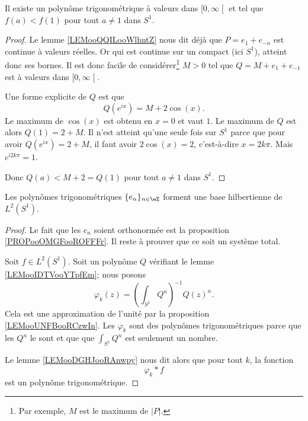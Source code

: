 \begin{lemma}       \label{LEMooIDTVooYTpfEm}
	Il existe un polynôme trigonométrique à valeurs dans \( \mathopen[ 0 , \infty \mathclose[\) et tel que \( f(a)<f(1)\) pour tout \( a\neq 1\) dans \( S^1\).
\end{lemma}

\begin{proof}
	Le lemme \ref{LEMooQQILooWlhntZ} nous dit déjà que \( P=e_1+e_{-n}\) est continue à valeurs réelles. Or qui est continue sur un compact (ici \( S^1\)), atteint donc ses bornes. Il est donc facile de considérer\footnote{Par exemple, \( M\) est le maximum de \( | P |\).} \( M>0\) tel que \( Q=M+e_1+e_{-1}\) est à valeurs dans \( \mathopen[ 0 , \infty \mathclose[\).

	Une forme explicite de \( Q\) est que
	\begin{equation}
		Q( e^{ix})=M+2\cos(x).
	\end{equation}
	Le maximum de \( \cos(x)\) est obtenu en \( x=0\) et vaut \( 1\). Le maximum de \( Q\) est alors \( Q(1)=2+M\). Il n'est atteint qu'une seule fois sur \( S^1\) parce que pour avoir \( Q( e^{ix})=2+M\), il faut avoir \( 2\cos(x)=2\), c'est-à-dire \( x=2k\pi\). Mais \(  e^{i2k\pi}=1\).

	Donc \( Q(a)<M+2=Q(1)\) pour tout \( a\neq 1\) dans \( S^1\).
\end{proof}

\begin{proposition}
	Les polynômes trigonométriques \( \{ e_n \}_{n\in \eZ}\) forment une base hilbertienne de \( L^2(S^1)\).
\end{proposition}

\begin{proof}
	Le fait que les \( e_n\) soient orthonormée est la proposition \ref{PROPooOMGFooROFFFr}. Il reste à prouver que ce soit un système total.

	Soit \( f\in L^2(S^1)\). Soit un polynôme \( Q\) vérifiant le lemme \ref{LEMooIDTVooYTpfEm}; nous posons
	\begin{equation}
		\varphi_k(z)=\left( \int_{S^1}Q^n \right)^{-1}Q(z)^n.
	\end{equation}
	Cela est une approximation de l'unité par la proposition \ref{LEMooUNFBooRCzwIn}. Les \( \varphi_k\) sont des polynômes trigonométriques parce que les \( Q^n\) le sont et que que \( \int_{S^1}Q^n\) est seulement un nombre.

	Le lemme \ref{LEMooDGHJooRAnwpy} nous dit alors que pour tout \( k\), la fonction
	\begin{equation}
		\varphi_k*f
	\end{equation}
	est un polynôme trigonométrique.
\end{proof}

